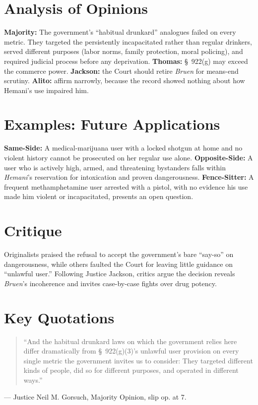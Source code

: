 \documentclass[12pt]{article}
\begin{document}
\section{Analysis of Opinions}
\textbf{Majority:} The government's ``habitual drunkard'' analogues failed on every metric. They targeted the persistently incapacitated rather than regular drinkers, served different purposes (labor norms, family protection, moral policing), and required judicial process before any deprivation. \textbf{Thomas:} \S~922(g) may exceed the commerce power. \textbf{Jackson:} the Court should retire \textit{Bruen} for means-end scrutiny. \textbf{Alito:} affirm narrowly, because the record showed nothing about how Hemani's use impaired him.

\section{Examples: Future Applications}
\textbf{Same-Side:} A medical-marijuana user with a locked shotgun at home and no violent history cannot be prosecuted on her regular use alone. \textbf{Opposite-Side:} A user who is actively high, armed, and threatening bystanders falls within \textit{Hemani}'s reservation for intoxication and proven dangerousness. \textbf{Fence-Sitter:} A frequent methamphetamine user arrested with a pistol, with no evidence his use made him violent or incapacitated, presents an open question.

\section{Critique}
Originalists praised the refusal to accept the government's bare ``say-so'' on dangerousness, while others faulted the Court for leaving little guidance on ``unlawful user.'' Following Justice Jackson, critics argue the decision reveals \textit{Bruen}'s incoherence and invites case-by-case fights over drug potency.

\section{Key Quotations}
\begin{quote}
``And the habitual drunkard laws on which the government relies here differ dramatically from \S~922(g)(3)'s unlawful user provision on every single metric the government invites us to consider: They targeted different kinds of people, did so for different purposes, and operated in different ways.''
\end{quote}
\noindent --- Justice Neil M. Gorsuch, Majority Opinion, slip op. at 7.
\end{document}
